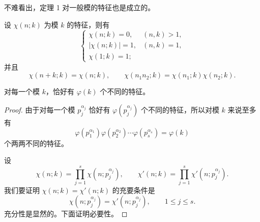 不难看出，定理 1 对一般模的特征也是成立的。

\begin{theorem}[原文 定理 \(1'\)]
	设 $\chi(n;k)$ 为模 $k$ 的特征，则有
	\[
	\begin{cases}
		\chi(n;k)=0, & (n,k)>1,\\
		|\chi(n;k)|=1, & (n,k)=1,\\
		\chi(1;k)=1;
	\end{cases}
	\]
	并且
	\[
		\chi(n+k;k)=\chi(n;k),\qquad
		\chi(n_1n_2;k)=\chi(n_1;k)\chi(n_2;k).
	\]
\end{theorem}

\begin{theorem}[原文 定理 8]
	对每一个模 $k$，恰好有 $\varphi(k)$ 个不同的特征。
\end{theorem}

\begin{proof}
	由于对每一个模 $p_j^{\alpha_j}$ 恰好有 $\varphi(p_j^{\alpha_j})$ 个不同的特征，所以对模 $k$ 来说至多有
	\[
		\varphi(p_1^{\alpha_1})\varphi(p_2^{\alpha_2})\cdots\varphi(p_s^{\alpha_s})
		=
		\varphi(k)
	\]
	个两两不同的特征。

	设
	\begin{equation}
		\chi(n;k)=\prod_{j=1}^{s}\chi(n;p_j^{\alpha_j}),
		\qquad
		\chi'(n;k)=\prod_{j=1}^{s}\chi'(n;p_j^{\alpha_j}).
		\tag{8}
	\end{equation}
	我们要证明 $\chi(n;k)=\chi'(n;k)$ 的充要条件是
	\begin{equation}
		\chi(n;p_j^{\alpha_j})=\chi'(n;p_j^{\alpha_j}),
		\qquad 1\leq j\leq s.
		\tag{9}
	\end{equation}
	充分性是显然的。下面证明必要性。


\end{proof}
